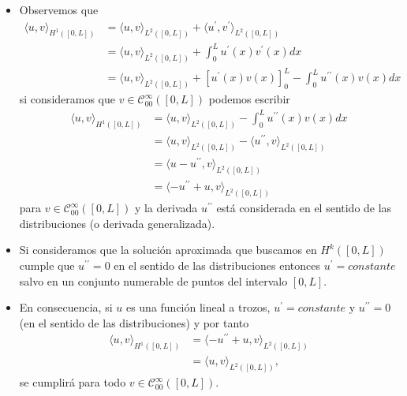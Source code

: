 \documentclass[10pt,handout]{beamer}
\theoremstyle{plain} %
\theoremstyle{plain} %
\theoremstyle{plain} %
\theoremstyle{plain} %
\theoremstyle{definition}
\theoremstyle{example}
\theoremstyle{example}
\theoremstyle{remark}
\theoremstyle{remark}
\begin{document}
\begin{frame}
\begin{itemize}
\item Observemos que
\begin{align*}
\langle u,v \rangle_{H^1([0,L])} & = \langle u,v \rangle_{L^2([0,L])} + \langle u^{\prime},v^{\prime} \rangle_{L^2([0,L])} \\ 
& = \langle u,v \rangle_{L^2([0,L])} + \int_0^L u^{\prime}(x)v^{\prime}(x)dx \\
& = \langle u,v \rangle_{L^2([0,L])} + [u^{\prime}(x)v(x)]_0^L - \int_0^L u^{\prime \prime}(x)v(x)dx
\end{align*}
si consideramos que $v \in \mathcal{C}_{00}^{\infty}([0,L])$ podemos escribir
\begin{align*}
\langle u,v \rangle_{H^1([0,L])} & = \langle u,v \rangle_{L^2([0,L])}  - \int_0^L u^{\prime \prime}(x)v(x)dx \\ 
& = \langle u,v \rangle_{L^2([0,L])} - \langle u^{\prime \prime},v \rangle_{L^2([0,L])} \\ 
& = \langle u -  u^{\prime \prime}, v \rangle_{L^2([0,L])} \\ 
& = \langle - u^{\prime \prime} + u , v \rangle_{L^2([0,L])}
\end{align*}
para $v \in \mathcal{C}_{00}^{\infty}([0,L])$ y la derivada $u^{\prime \prime}$ está considerada en el sentido de las distribuciones (o derivada generalizada).
\end{itemize}
\end{frame}

\begin{frame}
\begin{itemize}
\item Si consideramos que la solución aproximada que buscamos en $H^k([0,L])$ cumple que
$u^{\prime \prime} = 0$ en el sentido de las distribuciones entonces $u^{\prime} = constante$
salvo en un conjunto numerable de puntos del intervalo $[0,L].$
\item En consecuencia, si $u$ es una función lineal a trozos, $u^{\prime} = constante$ y 
$u^{\prime \prime} = 0$ (en el sentido de las distribuciones) y por tanto
\begin{align*}
\langle u,v \rangle_{H^1([0,L])} & = \langle - u^{\prime \prime} + u , v \rangle_{L^2([0,L])} \\ 
& = \langle u , v \rangle_{L^2([0,L])},
\end{align*}
se cumplirá para todo $v \in \mathcal{C}_{00}^{\infty}([0,L]).$
\end{itemize}
\end{frame}
\end{document}
